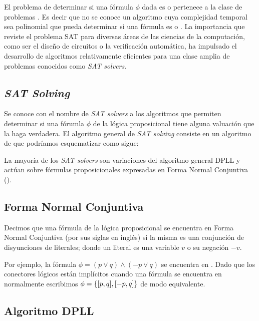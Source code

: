 \documentclass[a4paper, 11pt, twoside]{tesis}
\begin{document}
El problema de determinar si una fórmula $\phi$ dada es \sat o \unsat pertenece
a la clase de problemas \npc\cite{Cook:1971:CTP:800157.805047}. Es decir que no
se conoce un algoritmo cuya complejidad temporal sea polinomial que pueda determinar si una fórmula es \sat
o \unsat. La importancia que reviste el problema SAT para diversas áreas de las
ciencias de la computación, como ser el diseño de circuitos o la verificación
automática, ha impulsado el desarrollo de algoritmos relativamente eficientes
para una clase amplia de problemas conocidos como \emph{SAT solvers}.

\subsection{\emph{SAT Solving}}

Se conoce con el nombre de \emph{SAT solvers} a los algoritmos que permiten
determinar si una fórumla $\phi$ de la lógica proposicional tiene alguna
valuación que la haga verdadera. El algoritmo general de  \emph{SAT solving}
consiste en un algoritmo de \bt que podríamos esquematizar como sigue:


La mayoría de los \emph{SAT solvers} son
variaciones del algoritmo general
DPLL\cite{Davis:1962:MPT:368273.368557} y actúan sobre fórmulas
proposicionales expresadas en Forma Normal Conjuntiva (\cnf).

\subsection{Forma Normal Conjuntiva}

Decimos que una fórmula de la lógica proposicional se encuentra en Forma Normal
Conjuntiva (\cnf por sus siglas en inglés) si la misma es una conjunción de
disyunciones de literales; donde un literal es una variable $v$ o su negación
$-v$.

Por ejemplo, la fórmula $\phi = (p \vee q) \wedge (-p \vee q)$ se encuentra
en \cnf. Dado que los conectores lógicos están implícitos cuando una fórmula se
encuentra en \cnf normalmente escribimos $\phi = \{[p, q], [-p,
q]\}$ de modo equivalente.

\subsection{Algoritmo DPLL}
\end{document}
